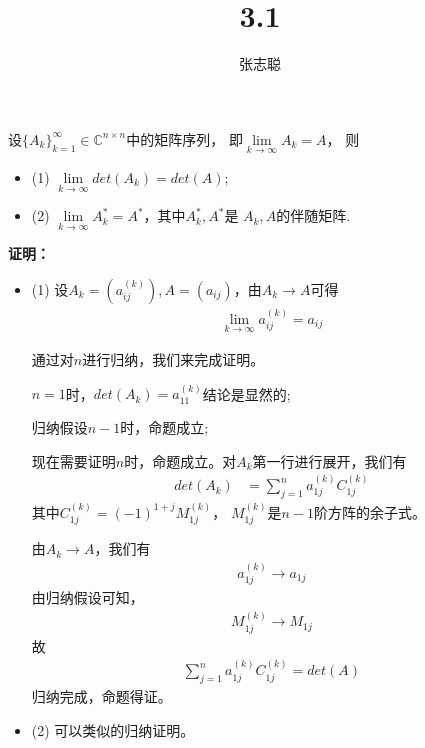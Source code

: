 \documentclass{article}
\begin{document}
\title{3.1}
\author{张志聪}
\maketitle

\begin{zremark}
  设$\{A_k\}_{k = 1}^{\infty} \in \mathbb{C}^{n \times n}$中的矩阵序列，
  即$\lim\limits_{k \to \infty} A_k = A$，
  则
  \begin{itemize}
    \item (1) $\lim\limits_{k \to \infty} det(A_k) = det(A)$;
    \item (2) $\lim\limits_{k \to \infty} A_k^{*} = A^{*}$，其中$A_k^{*}, A^{*}$是
          $A_k, A$的伴随矩阵.
  \end{itemize}
\end{zremark}

\textbf{证明：}
\begin{itemize}
  \item (1) 设$A_k = (a_{ij}^{(k)}), A = (a_{ij})$，由$A_k \to A$可得
        \begin{align*}
          \lim\limits_{k \to \infty} a_{ij}^{(k)} = a_{ij}
        \end{align*}

        通过对$n$进行归纳，我们来完成证明。

        $n = 1$时，$det(A_k) = a_{11}^{(k)}$结论是显然的;

        归纳假设$n - 1$时，命题成立;

        现在需要证明$n$时，命题成立。对$A_k$第一行进行展开，我们有
        \begin{align*}
          det(A_k)
           & = \sum\limits_{j = 1}^n a_{1j}^{(k)} C_{1j}^{(k)}
        \end{align*}
        其中$C_{1j}^{(k)} = (-1)^{1 + j} M_{1j}^{(k)}$，
        $M_{1j}^{(k)}$是$n - 1$阶方阵的余子式。

        由$A_k \to A$，我们有
        \begin{align*}
          a_{1j}^{(k)} \to a_{1j}
        \end{align*}
        由归纳假设可知，
        \begin{align*}
          M_{1j}^{(k)} \to M_{1j}
        \end{align*}
        故
        \begin{align*}
          \sum\limits_{j = 1}^n a_{1j}^{(k)} C_{1j}^{(k)} = det(A)
        \end{align*}
        归纳完成，命题得证。
  \item (2) 可以类似的归纳证明。
\end{itemize}
\end{document}
